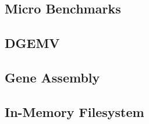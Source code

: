 \subsection{Micro Benchmarks}



\subsection{DGEMV}



\subsection{Gene Assembly}



\subsection{In-Memory Filesystem}


